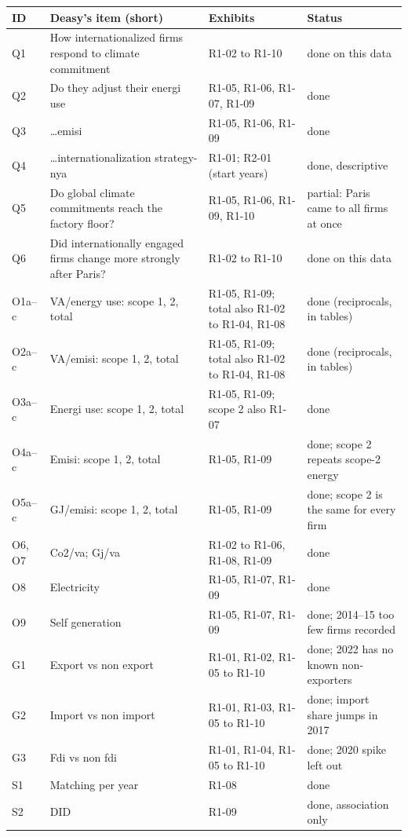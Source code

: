 {\footnotesize
\renewcommand{\arraystretch}{1.08}
\begin{tabularx}{\linewidth}{@{}l X p{4.3cm} p{4.6cm}@{}}
\toprule
ID & Deasy's item (short) & Exhibits & Status \\
\midrule
Q1 & How internationalized firms respond to climate commitment & R1-02 to R1-10 & done on this data \\
Q2 & Do they adjust their energi use & R1-05, R1-06, R1-07, R1-09 & done \\
Q3 & \ldots emisi & R1-05, R1-06, R1-09 & done \\
Q4 & \ldots internationalization strategy-nya & R1-01; R2-01 (start years) & done, descriptive \\
Q5 & Do global climate commitments reach the factory floor? & R1-05, R1-06, R1-09, R1-10 & partial: Paris came to all firms at once \\
Q6 & Did internationally engaged firms change more strongly after Paris? & R1-02 to R1-10 & done on this data \\
O1a--c & VA/energy use: scope 1, 2, total & R1-05, R1-09; total also R1-02 to R1-04, R1-08 & done (reciprocals, in tables) \\
O2a--c & VA/emisi: scope 1, 2, total & R1-05, R1-09; total also R1-02 to R1-04, R1-08 & done (reciprocals, in tables) \\
O3a--c & Energi use: scope 1, 2, total & R1-05, R1-09; scope 2 also R1-07 & done \\
O4a--c & Emisi: scope 1, 2, total & R1-05, R1-09 & done; scope 2 repeats scope-2 energy \\
O5a--c & GJ/emisi: scope 1, 2, total & R1-05, R1-09 & done; scope 2 is the same for every firm \\
O6, O7 & Co2/va; Gj/va & R1-02 to R1-06, R1-08, R1-09 & done \\
O8 & Electricity & R1-05, R1-07, R1-09 & done \\
O9 & Self generation & R1-05, R1-07, R1-09 & done; 2014--15 too few firms recorded \\
G1 & Export vs non export & R1-01, R1-02, R1-05 to R1-10 & done; 2022 has no known non-exporters \\
G2 & Import vs non import & R1-01, R1-03, R1-05 to R1-10 & done; import share jumps in 2017 \\
G3 & Fdi vs non fdi & R1-01, R1-04, R1-05 to R1-10 & done; 2020 spike left out \\
S1 & Matching per year & R1-08 & done \\
S2 & DID & R1-09 & done, association only \\

\end{tabularx}}
